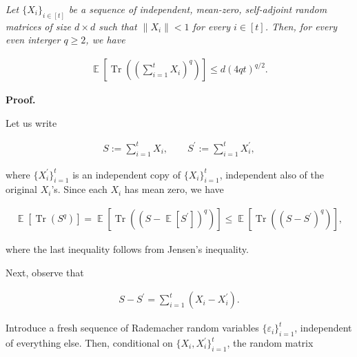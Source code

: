 \emph{Let $\{X_{i}\}_{i\in[t]}$ be a sequence of independent, mean-zero, self-adjoint random matrices of size $d\times d$ such that $\|X_{i}\|<1$ for every $i\in[t]$. Then, for every even interger $q\geq 2$, we have}\par


\[\begin{gathered}
\operatorname*{\mathbb{E}}\left[\operatorname*{Tr}\left(\left(\sum_{i=1}^{t}X_{i}\right)^{q}\right)\right]\leq d\left(4qt\right)^{q/2}.
\end{gathered}\]







\par\medskip\noindent\textbf{Proof.}\par




Let us write\par


\[\begin{gathered}
S:=\sum_{i=1}^{t}X_{i},\qquad S^{\prime}:=\sum_{i=1}^{t}X_{i}^{\prime},
\end{gathered}\]


where $\{X_{i}^{\prime}\}_{i=1}^{t}$ is an independent copy of $\{X_{i}\}_{i=1}^{t}$, independent also of the original $X_{i}$’s. Since each $X_{i}$ has mean zero, we have\par


\[\begin{gathered}
\operatorname*{\mathbb{E}}\left[\operatorname*{Tr}\left(S^{q}\right)\right]=\operatorname*{\mathbb{E}}\left[\operatorname*{Tr}\left((S-\operatorname*{\mathbb{E}}[S^{\prime}])^{q}\right)\right]\leq\operatorname*{\mathbb{E}}\left[\operatorname*{Tr}\left((S-S^{\prime})^{q}\right)\right],
\end{gathered}\]


where the last inequality follows from Jensen’s inequality.\par




Next, observe that\par


\[\begin{gathered}
S-S^{\prime}=\sum_{i=1}^{t}\left(X_{i}-X_{i}^{\prime}\right).
\end{gathered}\]


Introduce a fresh sequence of Rademacher random variables $\{\varepsilon_{i}\}_{i=1}^{t}$, independent of everything else. Then, conditional on $\{X_{i},X_{i}^{\prime}\}_{i=1}^{t}$, the random matrix\par


